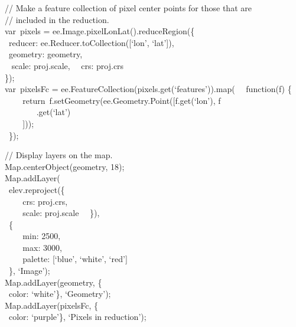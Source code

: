 \documentclass[
  letterpaper,
  DIV=11,
  numbers=noendperiod]{scrreprt}
\begin{document}
// Make a feature collection of pixel center points for those that are\\
// included in the reduction.\\
var~pixels = ee.Image.pixelLonLat().reduceRegion(\{\\
\hspace*{0.333em} ~reducer: ee.Reducer.toCollection({[}`lon',
`lat'{]}),\\
\hspace*{0.333em} ~geometry: geometry,\\
\hspace*{0.333em} ~ scale: proj.scale,~ ~crs: proj.crs\\
\});\\
var~pixelsFc = ee.FeatureCollection(pixels.get(`features')).map(~
~function(f) \{~ ~ ~
~return~f.setGeometry(ee.Geometry.Point({[}f.get(`lon'), f\\
\hspace*{0.333em} ~ ~ ~ ~ ~.get(`lat')\\
\hspace*{0.333em} ~ ~ ~{]}));\\
\hspace*{0.333em} ~\});

// Display layers on the map.\\
Map.centerObject(geometry, 18);\\
Map.addLayer(\\
\hspace*{0.333em} ~elev.reproject(\{\\
\hspace*{0.333em} ~ ~ ~crs: proj.crs,\\
\hspace*{0.333em} ~ ~ ~scale: proj.scale~ ~\}),\\
\hspace*{0.333em} ~\{\\
\hspace*{0.333em} ~ ~ ~min: 2500,\\
\hspace*{0.333em} ~ ~ ~max: 3000,\\
\hspace*{0.333em} ~ ~ ~palette: {[}`blue', `white', `red'{]}\\
\hspace*{0.333em} ~\}, `Image');\\
Map.addLayer(geometry, \{\\
\hspace*{0.333em} ~color: `white'\}, `Geometry');\\
Map.addLayer(pixelsFc, \{\\
\hspace*{0.333em} ~color: `purple'\}, `Pixels in reduction');
\end{document}
